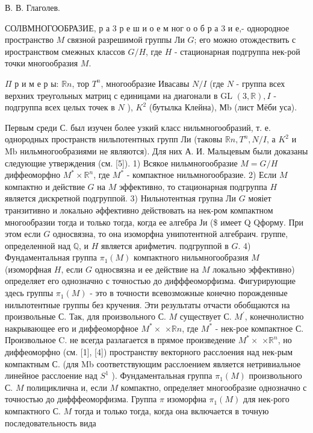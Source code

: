 \documentclass[10pt]{article}
\begin{document}
В. В. Глаголев.



СОЛВМНОГООБРАЗИЕ, р а 3 р е ш и о е м ног о о б р а 3 и е,- однородное пространство $M$ связноӥ разрешимой группы Ли $G$; его можно отождествить с иространством смежных классов $G / H$, где $H$ - стационарная подгруппа нек-рой точки многообразия $M$.



$\Pi$ р и м е р ы: $\mathbb{R} n$, тор $T^{n}$, многообразие Ивасавы $N / I$ (где $N$ - группа всех верхних треугольных матриц с единицами на диагонали в GL $(3, \mathbb{R}), I$ - подгруппа всех целых точек в $N$ ), $K^{2}$ (бутылка Клейна), Мb (лист Мёби уса).



Первым среди С. был изучен более узкий класс нильмногообразий, т. е. однородных пространств нильпотентных групп Ли (таковы $\mathbb{R} n, T^{n}, N / I$, а $K^{2}$ и $\mathrm{Mb}$ нильмногообразиями не являются). Для них А. И. Мальцевым были доказаны следующие утверждения (см. [5]). 1) Всякое нильмногообразие $M=G / H$ диффеоморфно $M^{*} \times \mathbb{R}^{n}$, где $M^{*}$ - компактное нильмногообразие. 2) Если $M$ компактно и действие $G$ на $M$ эффективно, то стационарная подгруппа $H$ является дискретной подгруппой. 3) Нильнотентная групна Ли $G$ мояіет транзитивно и локально әффективно действовать на нек-ром компактном многообразии тогда и только тогда, когда ее алгебра Ји (\$ имеет Q Qформу. При этом если $G$ односвязна, то она изоморфна унипотентной алгебраич. группе, определенной над $\mathbb{Q}$, и $H$ является арифметич. подгруппой в $G$. 4) Фундаментальная группа $\pi_{1}(M)$ компактного нильмногообразия $M$ (изоморфная $H$, если $G$ односвязна и ее действие на $M$ локально эффективно) определяет его однозначно с точностью до дифффеоморфизма. Фигурирующие здесь группы $\pi_{1}(M)$ - это в точности всевозможные конечно порожденные нильпотентные группы без кручения. Эти результаты отчасти обобщаются на произвольные С. Так, для произвольного С. $M$ существует С. $M^{\prime}$, конечнолистно накрывающее его и диффеоморфное $M^{*} \times$ $\times \mathbb{R} n$, где $M^{*}$ - нек-рое компактное С. Произвольное C. не всегда разлагается в прямое произведение $M^{*} \times$ $\times \mathbb{R}^{n}$, но диффеоморфно (см. [1], [4]) пространству векторного расслоения над нек-рым компактным С. (для Mb соответствующим расслоением является нетривиальное линейное расслоение над $S^{1}$ ). Фундаментальная группа $\pi_{1}(M)$ произвольного С. $M$ полициклична и, если $M$ компактно, определяет многообразие однозначно с точностью до дифффеоморфизма. Группа $\pi$ изоморфна $\pi_{1}(M)$ для нек-рого компактного С. $M$ тогда и только тогда, когда она включается в точную последовательность вида
\end{document}
